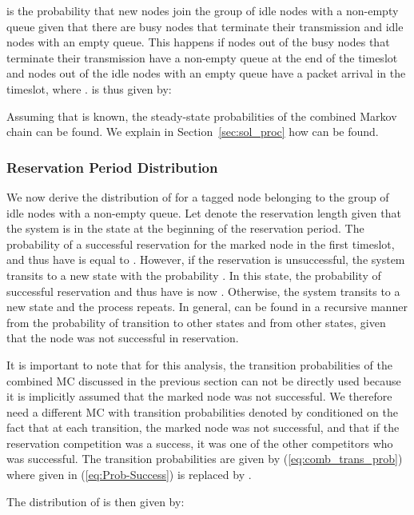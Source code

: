 \documentclass[12pt,journal,oneside,onecolumn]{IEEEtran}
\begin{document}
 is the probability that  new nodes join the group of idle nodes with a non-empty queue given that there are  busy nodes 
that terminate their transmission and  idle nodes with an empty queue. 
This happens if  nodes out of the  busy nodes 
that terminate their transmission have a non-empty queue at the end of the timeslot and  nodes out of the
 idle nodes with an empty queue have a packet arrival in the timeslot, where .  is thus given by:

\footnotesize

\normalsize
Assuming that  is known, the steady-state probabilities    of the combined Markov chain can be found. 
We explain in Section~\ref{sec:sol_proc} how  can be found. 


\subsubsection{Reservation Period Distribution}
\label{sec:res_per_dist}

We now derive the distribution of  for a tagged node belonging to the group of idle nodes with a non-empty queue.
Let  denote the reservation length given that the system is in the state  at the beginning of the reservation period.
The probability of a successful reservation for the marked node in the first timeslot, and thus have  is equal to . 
However, if the reservation is unsuccessful, the system transits to a new state  with the probability . 
In this state, the probability of successful reservation and thus have   is now . 
Otherwise, the system transits to a new state and the process repeats. In general, 
 can be found in a recursive manner from the probability of transition to other states  and  from other states, given that the node was not successful in reservation. 

It is important to note that for this analysis, the transition probabilities of the combined MC discussed in the previous
section can not be directly used because it is implicitly assumed that the marked node was not 
successful. We therefore need a different MC with transition probabilities denoted by  conditioned on the fact
that at each transition, the marked node was not successful, and that if the reservation
competition was a success, it was one of the other  competitors who was successful.  The transition probabilities 
are given by (\ref{eq:comb_trans_prob}) where  given in (\ref{eq:Prob-Success}) is replaced by 
.

The distribution of  is then given by:
\end{document}
